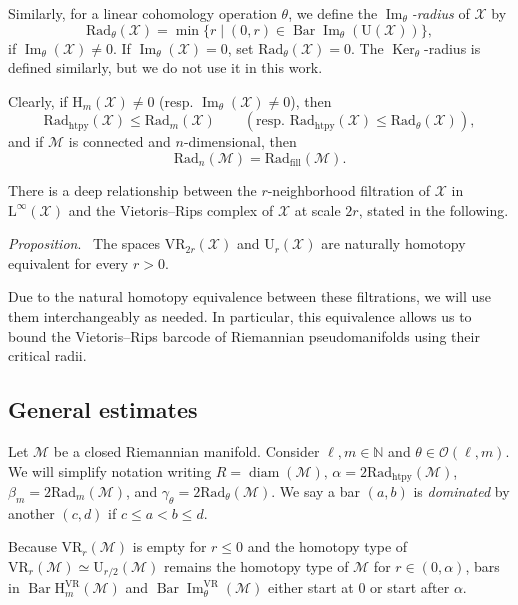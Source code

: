 \documentclass{amsart}
\makeatletter
\renewcommand\subsubsection{\@startsection{subsubsection}{3}
	\z@{.5\linespacing\@plus.7\linespacing}{0em}
	{\normalfont\itshape}}
\theoremstyle{definition}
\newcommand{\N}{\mathbb{N}}
\newcommand{\rH}{\mathrm{H}}
\newcommand{\rL}{\mathrm{L}}
\newcommand{\rU}{\mathrm{U}}
\newcommand{\cM}{\mathcal{M}}
\newcommand{\cO}{\mathcal{O}}
\newcommand{\cX}{\mathcal{X}}
\newcommand{\darkblue}{\color{darkblue}}
\newcommand{\defn}[1]{{\darkblue \emph{#1}}}
\newcommand{\VR}{\mathrm{VR}}
\renewcommand{\proposition}{\medskip\noindent\textit{\darkblue Proposition}.\ }
\theoremstyle{theorem}
\DeclareMathOperator{\barc}{Bar}
\DeclareMathOperator{\img}{Im}
\renewcommand{\ker}{\operatorname{Ker}}
\newcommand{\diam}{\operatorname{diam}}
\newcommand{\fillrad}{\mathrm{Rad}_{\mathrm{fill}}}
\newcommand{\crit}{\mathrm{Rad}_{\mathrm{htpy}}}
\newcommand{\firstdeath}[2]{\mathrm{Rad}_{#1}(#2)}
\providecommand{\DIFaddtex}[1]{{\protect\color{blue}\uwave{#1}}} %
\providecommand{\DIFdeltex}[1]{{\protect\color{red}\sout{#1}}}                      %
\providecommand{\DIFadd}[1]{\texorpdfstring{\DIFaddtex{#1}}{#1}} %
\providecommand{\DIFdel}[1]{\texorpdfstring{\DIFdeltex{#1}}{}} %
\renewcommand{\DIFadd}[1]{{\color{red}#1}}
\renewcommand{\DIFdel}[1]{{\color{deletedpurple}\ifmmode\oldmath{#1}\else\sout{#1}\fi}}
\newcommand{\oldmath}[1]{{\color{deletedpurple}\mathpalette\horizontalstrike{#1}}}
\newcommand{\horizontalstrike}[2]{\sbox0{$#1#2$}\rlap{\raisebox{.5\ht0}{\rule{\wd0}{.4pt}}}\usebox0}
\makeatother
\begin{document}
Similarly, for a linear cohomology operation \(\theta\), we define the \defn{\(\img_\theta\)-radius} of \(\cX\) by
\[
\firstdeath{\theta}{\cX} = \min \big\{r \mid (0, r) \in \barc \img_\theta(\rU(\cX))\big\},
\]
if \(\img_\theta(\cX) \neq 0\).
If \(\img_\theta(\cX) = 0\), set $\firstdeath{\theta}{\cX} = 0$.
The \(\ker_\theta\)-radius is defined similarly, but we do not use it in this work.

Clearly, if \(\rH_m(\cX) \neq 0\) (resp. \(\img_\theta(\cX) \neq 0\)), then
\[
\crit(\cX) \leq \firstdeath{m}{\cX} \qquad (\text{resp. }\crit(\cX) \leq \firstdeath{\theta}{\cX}),
\]
and if $\cM$ is connected and $n$-dimensional, then
\[
\firstdeath{n}{\cM} = \fillrad(\cM).
\]

\subsubsection{}\label{ss:kuratowski_vr}

There is a deep relationship between the \(r\)-neighborhood filtration of $\cX$ in $\rL^\infty(\cX)$ and the Vietoris--Rips complex of \(\cX\) at scale \(2r\), stated in the following.

\proposition \cite[\DIFdel{Thm.}\DIFadd{Theorem}~4.1]{lim2024vietoris} The spaces $\VR_{2r}(\cX)$ and $\rU_r(\cX)$ are naturally homotopy equivalent for every \(r > 0\).

\medskip Due to the natural homotopy equivalence between these filtrations, we will use them interchangeably as needed.
In particular, this equivalence allows us to bound the Vietoris--Rips barcode of Riemannian pseudomanifolds using their critical radii.

\subsection{General estimates}\label{ss:barcode_general}

Let \(\cM\) be a closed Riemannian manifold.
Consider \(\ell, m \in \N\) and \(\theta \in \cO(\ell,m)\).
We will simplify notation writing \(R = \diam(\cM),\, \alpha = 2\crit(\cM)\), \(\beta_m = 2\firstdeath{m}{\cM}\), and \(\gamma_\theta = 2\firstdeath{\theta}{\cM}\).
We say a bar $(a, b)$ is \defn{dominated} by another $(c,d)$ if $c \leq a < b \leq d$.

Because $\VR_r(\cM)$ is empty for \(r \leq 0\) and the homotopy type of $\VR_r(\cM)\simeq \rU_{r/2}(\cM)$ remains the homotopy type of $\cM$ for $r \in (0, \alpha)$, bars in \(\barc \rH_m^{\VR}(\cM)\) and $\barc\img_\theta^{\VR}(\cM)$ either start at $0$ or start after $\alpha$.
\end{document}
